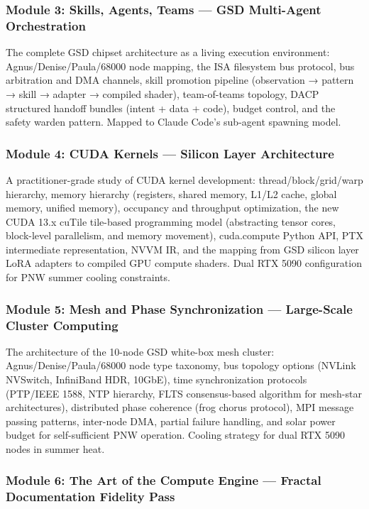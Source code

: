 \documentclass[11pt,letterpaper]{article}
\begin{document}
\subsubsection{Module 3: Skills, Agents, Teams --- GSD Multi-Agent Orchestration}

The complete GSD chipset architecture as a living execution environment: Agnus/Denise/Paula/68000 node mapping, the ISA filesystem bus protocol, bus arbitration and DMA channels, skill promotion pipeline (observation → pattern → skill → adapter → compiled shader), team-of-teams topology, DACP structured handoff bundles (intent + data + code), budget control, and the safety warden pattern. Mapped to Claude Code's sub-agent spawning model.

\subsubsection{Module 4: CUDA Kernels --- Silicon Layer Architecture}

A practitioner-grade study of CUDA kernel development: thread/block/grid/warp hierarchy, memory hierarchy (registers, shared memory, L1/L2 cache, global memory, unified memory), occupancy and throughput optimization, the new CUDA 13.x cuTile tile-based programming model (abstracting tensor cores, block-level parallelism, and memory movement), cuda.compute Python API, PTX intermediate representation, NVVM IR, and the mapping from GSD silicon layer LoRA adapters to compiled GPU compute shaders. Dual RTX 5090 configuration for PNW summer cooling constraints.

\subsubsection{Module 5: Mesh and Phase Synchronization --- Large-Scale Cluster Computing}

The architecture of the 10-node GSD white-box mesh cluster: Agnus/Denise/Paula/68000 node type taxonomy, bus topology options (NVLink NVSwitch, InfiniBand HDR, 10GbE), time synchronization protocols (PTP/IEEE 1588, NTP hierarchy, FLTS consensus-based algorithm for mesh-star architectures), distributed phase coherence (frog chorus protocol), MPI message passing patterns, inter-node DMA, partial failure handling, and solar power budget for self-sufficient PNW operation. Cooling strategy for dual RTX 5090 nodes in summer heat.

\subsubsection{Module 6: The Art of the Compute Engine --- Fractal Documentation Fidelity Pass}
\end{document}
